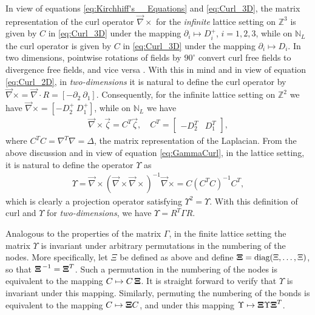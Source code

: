 \documentclass{cmslatex}
\newcommand\bXi{\mbox{\boldmath${\Xi}$}}
\begin{document}
In view of equations \eqref{eq:Kirchhiff's__Equations} and
\eqref{eq:Curl_3D}, the matrix representation of the curl operator
$\vec{\nabla}\times$ for the \emph{infinite} lattice setting on $\mathbb{Z}^3$
is given by $C$ in \eqref{eq:Curl_3D} under the mapping $\partial_i\mapsto D^+_i$,
$i=1,2,3$, while on $\mathbb{N}_L$ the curl operator is given by
$C$ in \eqref{eq:Curl_3D} under the mapping $\partial_i\mapsto D_i$. In two
dimensions, pointwise rotations of fields by $90^\circ$ convert curl free
fields to divergence free fields, and vice versa
\cite{MILTON:2002:TC}. With this in mind and in view of equation
\eqref{eq:Curl_2D}, in \emph{two-dimensions} it is natural to define
the curl operator by $\vec{\nabla}\times=\vec{\nabla}\cdot R=[ - \partial_2 \
\partial_1]$. Consequently, for the infinite lattice setting on
$\mathbb{Z}^2$ we have $\vec{\nabla}\times=[ - D^+_2 \ D^+_1]$, while on
$\mathbb{N}_L$ we have  
%
\begin{align}
  \vec{\nabla}\times\vec{\zeta}=C^T\vec{\zeta}, \quad
  C^T=
  \left[
    \begin{array}{ccc}
       -D_2^T  &   D_1^T
    \end{array}
  \right],
\end{align}
%
where $C^TC=\nabla^T\nabla=\Delta$, the matrix representation of the Laplacian. From
the above discussion and in view of equation \eqref{eq:GammaCurl}, in
the lattice setting, it is natural to define the operator $\Upsilon$ as
%
\begin{align}\label{eq:GammaCurl_NL}
  \Upsilon=\vec{\nabla}\times(\vec{\nabla}\times\vec{\nabla}\times)^{-1}\vec{\nabla}\times
   =C(C^TC)^{-1}C^T,
\end{align}
%
which is clearly a projection operator satisfying $\Upsilon^2=\Upsilon$. With this
definition of curl and $\Upsilon$ for \emph{two-dimensions}, we have $\Upsilon=R^T\Gamma R$. 




Analogous
to the properties of the matrix $\Gamma$, in the finite lattice setting the 
matrix $\Upsilon$ is invariant under arbitrary permutations in the numbering
of the nodes. More specifically, let $\Xi$ be defined as above and
define $\bXi=\text{diag}(\Xi,\ldots,\Xi)$, so that $\bXi^{\,-1}=\bXi^T$. Such a
permutation in the 
numbering of the nodes is equivalent to the mapping
$C\mapsto C\,\bXi$. It is straight forward to verify that $\Upsilon$ is invariant
under this mapping. Similarly, permuting the numbering of
the bonds is equivalent to the mapping $C\mapsto \bXi C$, and under
this mapping $\Upsilon\mapsto \bXi \Upsilon {\bXi}^T$.  
\end{document}
